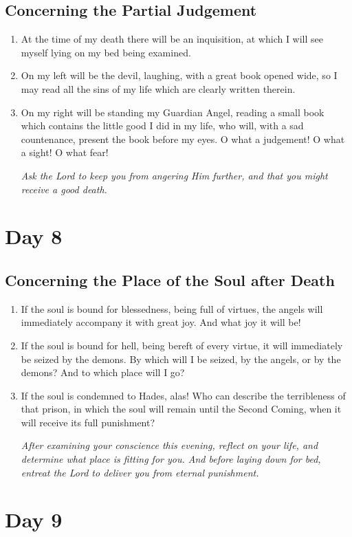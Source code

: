 \documentclass[11pt]{article}
\begin{document}
\subsection{Concerning the Partial Judgement}
\label{sec:orgb3e9854}
\begin{enumerate}
\item At the time of my death there will be an inquisition, at which I will see myself lying on my bed being examined.
\item On my left will be the devil, laughing, with a great book opened wide, so I may read all the sins of my life which are clearly written therein.
\item On my right will be standing my Guardian Angel, reading a small book which contains the little good I did in my life, who will, with a sad countenance, present the book before my eyes.
O what a judgement! O what a sight! O what fear!

\emph{Ask the Lord to keep you from angering Him further, and that you might receive a good death.}
\end{enumerate}
\section{Day 8}
\label{sec:org1a56b25}
\subsection{Concerning the Place of the Soul after Death}
\label{sec:orga55d707}
\begin{enumerate}
\item If the soul is bound for blessedness, being full of virtues, the angels will immediately accompany it with great joy. And what joy it will be!
\item If the soul is bound for hell, being bereft of every virtue, it will immediately be seized by the demons. By which will I be seized, by the angels, or by the demons?
And to which place will I go?
\item If the soul is condemned to Hades, alas! Who can describe the terribleness of that prison, in which the soul will remain until the Second Coming, when it will receive its full punishment?

\emph{After examining your conscience this evening, reflect on your life, and determine what place is fitting for you. And before laying down for bed, entreat the Lord to deliver you from eternal punishment.}
\end{enumerate}
\section{Day 9}
\label{sec:org45e1471}
\end{document}
